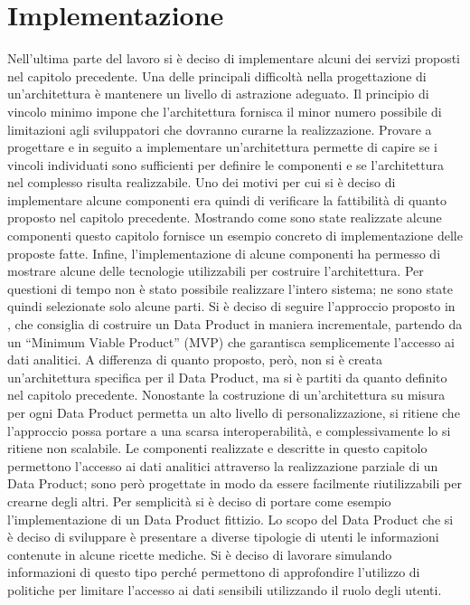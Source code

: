 \documentclass[12pt]{report}
\begin{document}
\chapter{Implementazione}\label{implementazione}
Nell'ultima parte del lavoro si è deciso di implementare alcuni dei servizi proposti nel capitolo precedente.
Una delle principali difficoltà nella progettazione di un'architettura è mantenere un livello di astrazione adeguato.
Il principio di vincolo minimo impone che l'architettura fornisca il minor numero possibile di limitazioni agli sviluppatori che dovranno curarne la realizzazione.
Provare a progettare e in seguito a implementare un'architettura permette di capire se i vincoli individuati sono sufficienti per definire le componenti e se l'architettura nel complesso risulta realizzabile.
Uno dei motivi per cui si è deciso di implementare alcune componenti era quindi di verificare la fattibilità di quanto proposto nel capitolo precedente.
Mostrando come sono state realizzate alcune componenti questo capitolo fornisce un esempio concreto di implementazione delle proposte fatte.
Infine, l'implementazione di alcune componenti ha permesso di mostrare alcune delle tecnologie utilizzabili per costruire l'architettura. 
Per questioni di tempo non è stato possibile realizzare l'intero sistema; ne sono state quindi selezionate solo alcune parti.
Si è deciso di seguire l'approccio proposto in \cite{majchrzak2023data}, che consiglia di costruire un Data Product in maniera incrementale, partendo da un ``Minimum Viable Product'' (MVP) che garantisca semplicemente l'accesso ai dati analitici.
A differenza di quanto proposto, però, non si è creata un'architettura specifica per il Data Product, ma si è partiti da quanto definito nel capitolo precedente.
Nonostante la costruzione di un'architettura su misura per ogni Data Product permetta un alto livello di personalizzazione, si ritiene che l'approccio possa portare a una scarsa interoperabilità, e complessivamente lo si ritiene non scalabile.
Le componenti realizzate e descritte in questo capitolo permettono l'accesso ai dati analitici attraverso la realizzazione parziale di un Data Product; sono però progettate in modo da essere facilmente riutilizzabili per crearne degli altri. 
Per semplicità si è deciso di portare come esempio l'implementazione di un Data Product fittizio.
Lo scopo del Data Product che si è deciso di sviluppare è presentare a diverse tipologie di utenti le informazioni contenute in alcune ricette mediche.
Si è deciso di lavorare simulando informazioni di questo tipo perché permettono di approfondire l'utilizzo di politiche per limitare l'accesso ai dati sensibili utilizzando il ruolo degli utenti.
\end{document}
